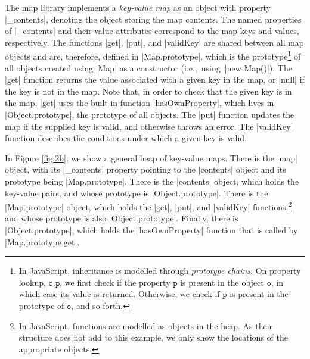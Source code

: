 The map library implements a \emph{key-value map} as an object with property \jsinline|_contents|, denoting the object storing the map contents.  
The named properties of \jsinline|_contents| and their value attributes correspond to the map keys and values, respectively.
The functions \jsinline|get|, \jsinline|put|, and \jsinline|validKey| are shared between all map 
objects and are, therefore, defined in \jsinline|Map.prototype|, which is the prototype\footnote{In JavaScript, inheritance is modelled through \emph{prototype chains}. On property lookup, $\mathtt{o.p}$, we first check if the property $\mathtt{p}$ is present in the object $\mathtt{o}$, in which case its value is returned. Otherwise, we  check if $\mathtt{p}$ is present in the prototype of $\mathtt{o}$, and so  forth.} of all objects created using \jsinline|Map| as a constructor (i.e.,~using~\jsinline|new Map()|). 
The \jsinline|get| function returns the value associated with a given key in the map, or \jsinline|null| if the key is not in the map. 
Note that, in order to check that the given key is in the map, \jsinline|get| uses the built-in function \jsinline|hasOwnProperty|, which lives in \jsinline|Object.prototype|, the prototype of all objects.
The \jsinline|put| function updates the map if the supplied key is valid, and otherwise throws an error. 
The \jsinline|validKey| function describes the conditions under which a given key is valid. 

In Figure \ref{fig:2b}, we show a general heap of key-value maps. There is the \jsinline|map| object, with its \jsinline|_contents| property pointing to the \jsinline|contents| object and its prototype being \jsinline|Map.prototype|. There is the \jsinline|contents| object, which holds the key-value pairs, and whose prototype is \jsinline|Object.prototype|. There is the \jsinline|Map.prototype| object, which holds the \jsinline|get|, \jsinline|put|, and \jsinline|validKey| functions,\footnote{In JavaScript, functions are modelled as objects in the heap. As their structure does not add to this example, we only show the locations of the appropriate objects.} and whose prototype is also \jsinline|Object.prototype|. Finally, there is \jsinline|Object.prototype|, which holds the \jsinline|hasOwnProperty| function that is called by \jsinline|Map.prototype.get|.


